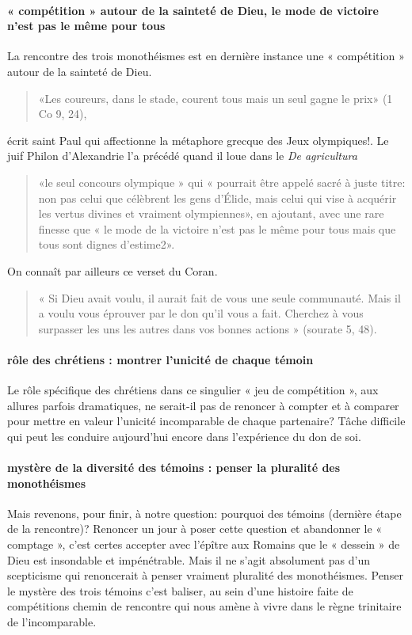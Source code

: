 \paragraph{« compétition » autour de la sainteté de Dieu, le mode de victoire n'est pas le même pour tous}
La rencontre des trois monothéismes est en dernière instance une « compétition » autour de la sainteté de Dieu.
\begin{quote}
    «Les coureurs, dans le stade, courent tous mais un seul gagne le prix» (1 Co 9, 24),
\end{quote}
 écrit saint Paul qui affectionne la métaphore grecque des Jeux olympiques!. Le juif Philon d'Alexandrie l'a précédé quand il loue dans le \textit{De agricultura} 
 \begin{quote}
 «le seul concours olympique » qui « pourrait être appelé sacré à juste titre: non pas celui que célèbrent les gens d'Élide, mais celui qui vise à acquérir les vertus divines et vraiment olympiennes», en ajoutant, avec une rare finesse que « le mode de la victoire n'est pas le même pour tous mais que tous sont dignes d'estime2».    
 \end{quote}
  On connaît par ailleurs ce verset du Coran. \begin{quote}
      « Si Dieu avait voulu, il aurait fait de vous une seule communauté. Mais il a voulu vous éprouver par le don qu'il vous a fait. Cherchez à vous surpasser les uns les autres dans vos bonnes actions » (sourate 5, 48).
  \end{quote}

\paragraph{rôle des chrétiens : montrer l'unicité de chaque témoin}
Le rôle spécifique des chrétiens dans ce singulier « jeu de compétition », aux allures parfois dramatiques, ne serait-il pas de renoncer à compter et à comparer pour mettre en valeur l'unicité incomparable de chaque partenaire? Tâche difficile qui peut les conduire aujourd'hui encore dans l'expérience du don de soi.
\paragraph{mystère de la diversité des témoins : penser la pluralité des monothéismes}
Mais revenons, pour finir, à notre question: pourquoi des témoins (dernière étape de la rencontre)? Renoncer un jour à poser cette question et abandonner le « comptage », c'est certes accepter avec l'épître aux Romains que le « dessein » de Dieu est insondable et impénétrable. Mais il ne s'agit absolument pas d'un scepticisme qui renoncerait à penser vraiment pluralité des monothéismes. Penser le mystère des trois témoins c'est baliser, au sein d'une histoire faite de compétitions chemin de rencontre qui nous amène à vivre dans le règne trinitaire de l'incomparable.
